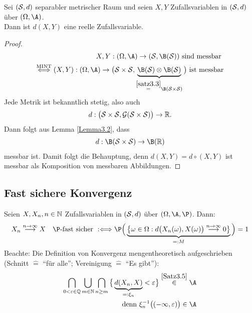 \begin{satz}\label{Satz3.5} %
	Sei $(\S,d)$ separabler metrischer Raum und seien $X,Y$ Zufallsvariablen in $(\S,d)$ über $(\Omega,\A)$.\\
	Dann ist $d(X,Y)$ eine reelle Zufallsvariable.
\end{satz}

\begin{proof}
	\begin{align*}
		X,Y:(\Omega,\A)\to(\S,\B(\S))\text{ sind messbar }\\
		\stackrel{\text{MINT}}{\Longleftrightarrow}
		(X,Y):(\Omega,\A)\to\big(\S\times\S,\underbrace{\B(\S)\otimes\B(\S)}_{\stackeq{\ref{satz3.3}}\B(\S\times\S)}\big)\text{ ist messbar}\\
	\end{align*}
	Jede Metrik ist bekanntlich stetig, also auch
	\begin{align*}
		d:\big(\S\times\S,\G(\S\times\S)\big)\to\R.
	\end{align*}
	Dann folgt aus Lemma \ref{Lemma3.2}, dass
	\begin{align*}
		d:\B(\S\times\S)\to\B(\R)
	\end{align*}
	messbar ist.
	Damit folgt die Behauptung, denn $d(X,Y)=d\circ(X,Y)$ ist messbar als Komposition von messbaren Abbildungen.
\end{proof}

\subsection*{Fast sichere Konvergenz} %
\begin{definition} %
	Seien $X,X_n,n\in\N$ Zufallsvariablen in $(\S,d)$ über $(\Omega,\A,\P)$. 
	Dann:
	\begin{align*}
		X_n\stackrel{n\to\infty}{\longrightarrow} X\quad\P\text{-fast sicher }:\Longleftrightarrow
		\P\Big(\underbrace{\big\lbrace\omega\in\Omega:d\big(X_n(\omega),X(\omega)\big)\stackrel{n\to\infty}{\longrightarrow} 0\big\rbrace}_{=:M}\Big)=1
	\end{align*}
	Beachte: Die Definition von Konvergenz mengentheoretisch aufgeschrieben (Schnitt $\hat{=}$ ``für alle''; Vereinigung $\hat{=}$ ``Es gibt''):
	\begin{align*}
		\bigcap\limits_{0<\varepsilon\in\Q}
		\bigcup\limits_{m\in\N}
		\bigcap\limits_{n\geq m}
		\big\lbrace\underbrace{d(X_n,X)}_{=:\xi_n}<\varepsilon\big\rbrace\stackrel{\ref{Satz3.5}}{\in}\A\\
		\text{denn }\xi_n^{-1}\big((-\infty,\varepsilon)\big)\in\A
	\end{align*}
\end{definition}

